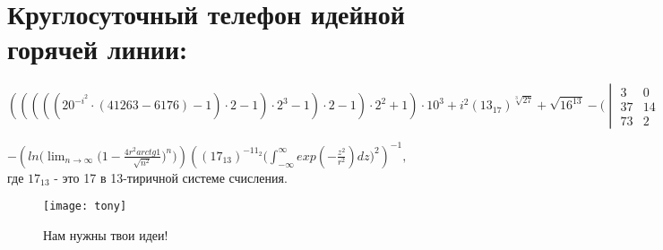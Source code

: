 \section*{Круглосуточный телефон идейной горячей линии:}
$(((((20^{-i^2}\cdot (41263-6176)-1)\cdot 2-1)\cdot 2^3 -1)\cdot 2-1)\cdot 2^2 +1)\cdot 10^3 + i^2(13_{17})^{\sqrt[3]{27}} +\sqrt{16^{13}}  -\Bigg( 
\begin{vmatrix}{}
3 & 0 & 0 \\
37 & 14 & 7 \\
73 & 2 & 17
\end{vmatrix}
 -1 \Bigg)\cdot 10^5 +
\begin{vmatrix}{}
14 & 5 & 10 \\
0 & 0 & 1 \\
3 & 8 & 69
\end{vmatrix}
- (2-33)(17-48) + \cos^{11}(2\arccos(\sqrt{\frac{11}{2}}))  +e^{-i\frac{\pi}{2}}\sqrt{9191 -(7\cdot 20^3+7\cdot 10^2) + 3\cdot (-5)}  -9,99329\cdot 10^{10}\cdot \bigg(\frac{\partial sin(xy)}{\partial y}\bigg)_{x=1,y=0}-$


  $-
(ln\big(\lim_{n \rightarrow \infty}\big(1-\frac{4r^2 arctg 1}{\sqrt{n^2}} \big)^n\big))((17_{13})^{-11_2}\big(\int_{-\infty}^{\infty}exp(-\frac{z^2}{r^2})dz \big)^2)^{-1}, $\\




где $17_{13}$ - это 17 в 13-тиричной системе счисления.

\begin{figure}[ht!]
    \centering
    \texttt{[image: tony]}
    \caption{Нам нужны твои идеи!}
\end{figure}
